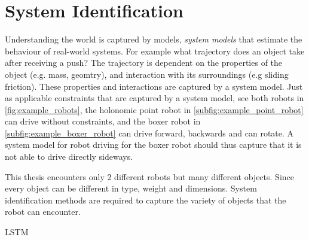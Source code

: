 \section{System Identification}%
\label{sec:sys_iden}
Understanding the world is captured by models, \textit{system models} that estimate the behaviour of real-world systems. For example what trajectory does an object take after receiving a push? The trajectory is dependent on the properties of the object (e.g. mass, geomtry), and interaction with its surroundings (e.g sliding friction). These properties and interactions are captured by a system model. Just as applicable constraints that are captured by a system model, see both robots in \cref{fig:example_robots}, the holonomic point robot in \cref{subfig:example_point_robot} can drive without constraints, and the boxer robot in \cref{subfig:example_boxer_robot} can drive forward, backwards and can rotate. A system model for robot driving for the boxer robot should thus capture that it is not able to drive directly sideways.\bs

This thesis encounters only 2 different robots but many different objects. Since every object can be different in type, weight and dimensions. System identification methods are required to capture the variety of objects that the robot can encounter.\bs



\ac{LSTM}

